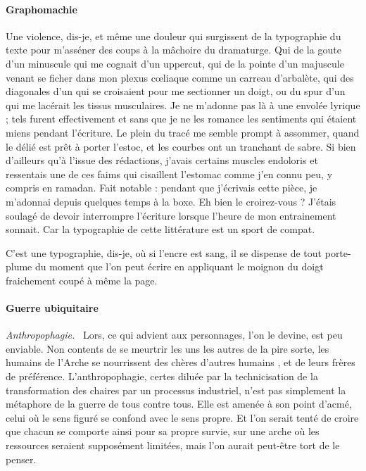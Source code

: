 \paragraph{Graphomachie}
Une violence, dis-je, et même une douleur qui surgissent de la typographie du texte pour m’asséner des coups à la mâchoire du dramaturge. Qui de la goute d’un  minuscule qui me cognait d’un uppercut, qui de la pointe d’un  majuscule venant se ficher dans mon plexus cœliaque comme un carreau d’arbalète, qui des diagonales d’un  qui se croisaient pour me sectionner un doigt, ou du spur d’un  qui me lacérait les tissus musculaires. Je ne m’adonne pas là à une envolée lyrique ; tels furent effectivement et sans que je ne les romance les sentiments qui étaient miens pendant l’écriture. Le plein du tracé me semble prompt à assommer, quand le délié est prêt à porter l’estoc, et les courbes ont un tranchant de sabre.  Si bien d’ailleurs qu’à l’issue des rédactions, j’avais certains muscles endoloris et ressentais une de ces faims qui cisaillent l’estomac comme j’en connu peu, y compris en ramadan. Fait notable : pendant que j’écrivais cette pièce, je m’adonnai depuis quelques temps à la boxe. Eh bien le croirez-vous ? J’étais soulagé de devoir interrompre l’écriture lorsque l’heure de mon entrainement sonnait. Car la typographie de cette littérature est un sport de compat.

C’est une typographie, dis-je, où si l’encre est sang, il se dispense de tout porte-plume du moment que l’on peut écrire en appliquant le moignon du doigt fraichement coupé  à même la page.


\paragraph{Guerre ubiquitaire}%
{\em\normalsize Anthropophagie.}~
Lors, ce qui advient aux personnages, l’on le devine, est peu enviable. Non contents de se meurtrir les uns les autres de la pire sorte, les humains de l’Arche se nourrissent des chères d’autres humains , et de leurs frères de préférence. L’anthropophagie, certes diluée par la technicisation de la transformation des chaires par un processus industriel, n’est pas simplement la métaphore de la guerre de tous contre tous. Elle est amenée à son point d’acmé, celui où le sens figuré se confond avec le sens propre. 
Et l’on serait tenté de croire que chacun se comporte ainsi pour sa propre survie, sur une arche où les ressources seraient supposément limitées, mais l’on aurait peut-être tort de le penser.

